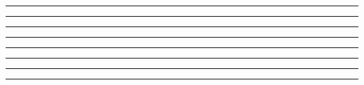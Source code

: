 \begin{minipage}{\textwidth}
    \centering
    \hrule height 0.5pt \hfill \break
    \hrule height 0.5pt \hfill \break
    \hrule height 0.5pt \hfill \break
    \hrule height 0.5pt \hfill \break
    \hrule height 0.5pt \hfill \break
    \hrule height 0.5pt \hfill \break
    \hrule height 0.5pt \hfill \break   
    \hrule height 0.5pt
\end{minipage}
